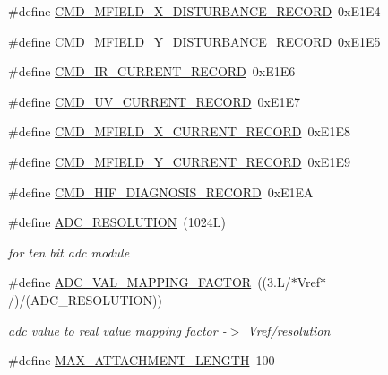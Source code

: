 \begin{DoxyCompactItemize}
\item 
\#define \hyperlink{a00086_ab84aea346a3f75b58f8bda67b8ae9be0}{C\+M\+D\+\_\+\+M\+F\+I\+E\+L\+D\+\_\+\+X\+\_\+\+D\+I\+S\+T\+U\+R\+B\+A\+N\+C\+E\+\_\+\+R\+E\+C\+O\+R\+D}~0x\+E1\+E4
\item 
\#define \hyperlink{a00086_af77e9c0ad32b3cc50d61992d4b64a831}{C\+M\+D\+\_\+\+M\+F\+I\+E\+L\+D\+\_\+\+Y\+\_\+\+D\+I\+S\+T\+U\+R\+B\+A\+N\+C\+E\+\_\+\+R\+E\+C\+O\+R\+D}~0x\+E1\+E5
\item 
\#define \hyperlink{a00086_a4dcce4fd3ff29eb6782f3228901f99cf}{C\+M\+D\+\_\+\+I\+R\+\_\+\+C\+U\+R\+R\+E\+N\+T\+\_\+\+R\+E\+C\+O\+R\+D}~0x\+E1\+E6
\item 
\#define \hyperlink{a00086_ab0e0364ddc2d95d1e5b51a3e3ff50918}{C\+M\+D\+\_\+\+U\+V\+\_\+\+C\+U\+R\+R\+E\+N\+T\+\_\+\+R\+E\+C\+O\+R\+D}~0x\+E1\+E7
\item 
\#define \hyperlink{a00086_ab796345ffdbc6a240b67b56583bb77c6}{C\+M\+D\+\_\+\+M\+F\+I\+E\+L\+D\+\_\+\+X\+\_\+\+C\+U\+R\+R\+E\+N\+T\+\_\+\+R\+E\+C\+O\+R\+D}~0x\+E1\+E8
\item 
\#define \hyperlink{a00086_a8ddac7f7a2a90f2d8535af02e338b1bf}{C\+M\+D\+\_\+\+M\+F\+I\+E\+L\+D\+\_\+\+Y\+\_\+\+C\+U\+R\+R\+E\+N\+T\+\_\+\+R\+E\+C\+O\+R\+D}~0x\+E1\+E9
\item 
\#define \hyperlink{a00086_a185ed5442d69c7c8abba13323a8e8187}{C\+M\+D\+\_\+\+H\+I\+F\+\_\+\+D\+I\+A\+G\+N\+O\+S\+I\+S\+\_\+\+R\+E\+C\+O\+R\+D}~0x\+E1\+E\+A
\item 
\#define \hyperlink{a00086_a00978ca9e8220475258dcbbbb7d29129}{A\+D\+C\+\_\+\+R\+E\+S\+O\+L\+U\+T\+I\+O\+N}~(1024\+L)
\begin{DoxyCompactList}\small\item\em for ten bit adc module \end{DoxyCompactList}\item 
\#define \hyperlink{a00086_ada92d3eeeec0cbeee41e76a52d145792}{A\+D\+C\+\_\+\+V\+A\+L\+\_\+\+M\+A\+P\+P\+I\+N\+G\+\_\+\+F\+A\+C\+T\+O\+R}~((3.\+L/$\ast$\+Vref$\ast$/)/(\+A\+D\+C\+\_\+\+R\+E\+S\+O\+L\+U\+T\+I\+O\+N))
\begin{DoxyCompactList}\small\item\em adc value to real value mapping factor -\/$>$ Vref/resolution \end{DoxyCompactList}\item 
\#define \hyperlink{a00086_aa8abe3a822c64813f7aaba3ca7e3db9c}{M\+A\+X\+\_\+\+A\+T\+T\+A\+C\+H\+M\+E\+N\+T\+\_\+\+L\+E\+N\+G\+T\+H}~100
\end{DoxyCompactItemize}


